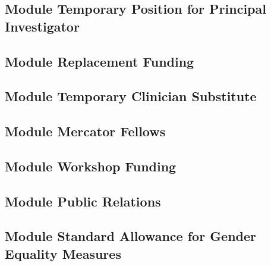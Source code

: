 \documentclass{scrartcl}
\begin{document}



\vspace*{2cm}

\subsection{Module Temporary Position for Principal Investigator}

\subsection{Module Replacement Funding}

\subsection{Module Temporary Clinician Substitute}

\subsection{Module Mercator Fellows}

\subsection{Module Workshop Funding}

\subsection{Module Public Relations}

\subsection{Module Standard Allowance for Gender Equality Measures}
\end{document}
